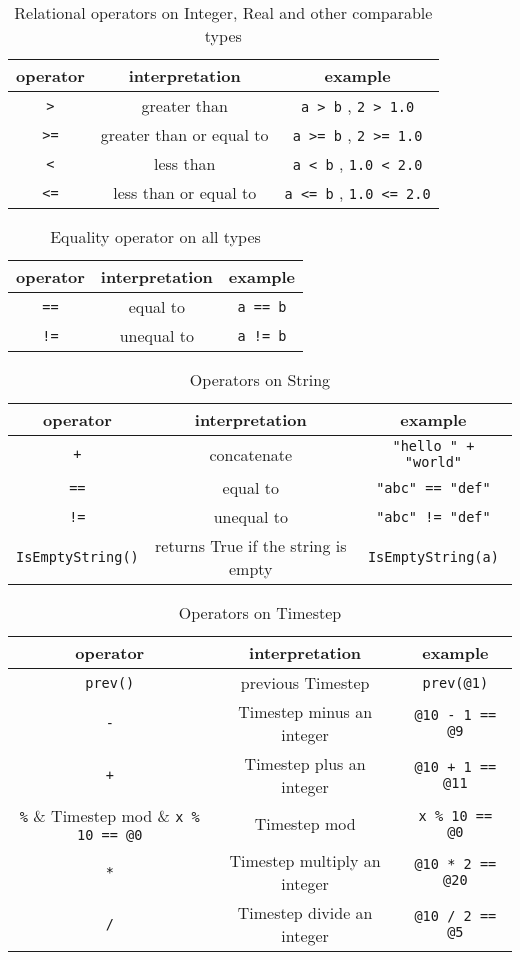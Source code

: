 \begin{table}[H]
\centering
\caption{Relational operators on Integer, Real and other comparable types}
\begin{tabular}{ c c c }
\toprule 
operator & interpretation & example \\
\midrule
{\tt >} & greater than & \verb|a > b| ,  \verb|2 > 1.0|\\ 
{\tt >=} & greater than or equal to & \verb|a >= b| ,  \verb|2 >= 1.0| \\ 
{\tt <} & less than & \verb|a < b| ,  \verb|1.0 < 2.0| \\
{\tt <=} & less than or equal to & \verb|a <= b| ,  \verb|1.0 <= 2.0|  \\
\bottomrule
\end{tabular}
\end{table}

\begin{table}[H]
\centering
\caption{Equality operator on all types}
\begin{tabular}{ c c c }
\toprule 
operator & interpretation & example \\
\midrule
{\tt ==} & equal to & \verb|a == b|   \\ 
{\tt !=} & unequal to & \verb|a != b|  \\ 
\bottomrule
\end{tabular}
\end{table}

\begin{table}[H]
\centering
\caption{Operators on String}
\begin{tabular}{ c c c }
\toprule 
operator & interpretation & example \\
\midrule
{\tt +} & concatenate & \verb|"hello " + "world"|  \\ 
{\tt ==} & equal to & \verb|"abc" == "def"|  \\
{\tt !=} & unequal to & \verb|"abc" != "def"|\\ 
\verb|IsEmptyString()| & returns True if the string is empty & \verb|IsEmptyString(a)| \\
\bottomrule
\end{tabular}
\end{table}

\begin{table}[H]
\centering
\caption{Operators on Timestep}
\begin{tabular}{ c c c }
\toprule 
operator & interpretation & example \\
\midrule
\verb|prev()| & previous Timestep & \verb|prev(@1)|  \\
\verb|-| & Timestep minus an integer & \verb|@10 - 1 == @9|  \\
\verb|+| & Timestep plus an integer & \verb|@10 + 1 == @11|  \\
\verb|%| &  Timestep mod & \verb|x % 10 == @0|  \\
\verb|*| & Timestep multiply an integer & \verb|@10 * 2 == @20|  \\
\verb|/| & Timestep divide an integer & \verb|@10 / 2 == @5|  \\
\bottomrule
\end{tabular}
\end{table}

